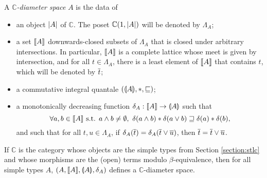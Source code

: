 \begin{definition} A \emph{$\mathbb{C}$-diameter space} $A$ is the data of \begin{itemize}
\item an object $\left\vert A\right\vert$ of $\mathbb{C}$. The poset $\mathbb{C}(1,\left\vert A\right\vert)$ will be denoted by $\Lambda_A$;
\item a set $\llbracket A \rrbracket$ downwards-closed subsets of $\Lambda_A$ that is closed under arbitrary intersections. In particular, $\llbracket A \rrbracket$ is a complete lattice whose meet is given by intersection, and for all $t\in\Lambda_A$, there is a least element of $\llbracket A \rrbracket$ that contains $t$, which will be denoted by $\overline{t}$;
\item a commutative integral quantale $(\llparenthesis A \rrparenthesis, \mathbin{\ast}, \sqsubseteq)$;
\item a monotonically decreasing function $\delta_A : \llbracket A \rrbracket \to \llparenthesis A \rrparenthesis$ such that $$\forall a,b \in \llbracket A \rrbracket \text{ s.t. } a \wedge b \neq \emptyset,~ \delta(a \wedge b) \mathbin{\ast} \delta(a \vee b) \sqsupseteq \delta(a) \mathbin{\ast} \delta(b)\text{,}$$
and such that for all $t,u \in \Lambda_A$, if $\delta_A(\overline{t}) = \delta_A(\overline{t} \vee \overline{u})$, then $\overline{t} = \overline{t} \vee \overline{u}$.
\end{itemize}
\end{definition}

\begin{example} If $\mathbb{C}$ is the category whose objects are the simple types from Section \ref{section:stlc} and whose morphisms are the (open) terms modulo $\beta$-equivalence, then for all simple types $A$, $(A, \llbracket A \rrbracket, \llparenthesis A \rrparenthesis, \delta_A)$ defines a $\mathbb{C}$-diameter space.
\end{example}

